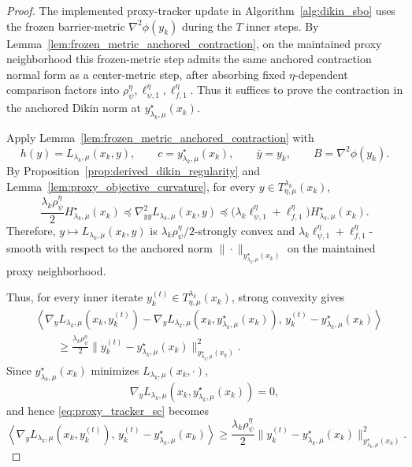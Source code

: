 \documentclass{article}
\begin{document}
\begin{proof}
The implemented proxy-tracker update in Algorithm~\ref{alg:dikin_sbo} uses the frozen barrier-metric
\(\nabla^2\phi(y_k)\) during the \(T\) inner steps. By
Lemma~\ref{lem:frozen_metric_anchored_contraction}, on the maintained proxy neighborhood this frozen-metric
step admits the same anchored contraction normal form as a center-metric step, after absorbing fixed
\(\eta\)-dependent comparison factors into
\(\rho_\psi^\eta,\ell_{\psi,1}^\eta,\ell_{f,1}^\eta\). Thus it suffices to prove the contraction in the
anchored Dikin norm at \(y_{\lambda_k,\mu}^\star(x_k)\).

Apply Lemma~\ref{lem:frozen_metric_anchored_contraction} with
\[
h(y)=L_{\lambda_k,\mu}(x_k,y),
\qquad
c=y_{\lambda_k,\mu}^\star(x_k),
\qquad
\bar y=y_k,
\qquad
B=\nabla^2\phi(y_k).
\]
By Proposition~\ref{prop:derived_dikin_regularity} and
Lemma~\ref{lem:proxy_objective_curvature}, for every
\(y\in T_{\eta,\mu}^{\lambda_k}(x_k)\),
\begin{equation}
\label{eq:proxy_tracker_curvature}
\frac{\lambda_k\rho_\psi^\eta}{2}H_{\lambda_k,\mu}^\star(x_k)
\preceq
\nabla_{yy}^2L_{\lambda_k,\mu}(x_k,y)
\preceq
\bigl(\lambda_k\ell_{\psi,1}^\eta+\ell_{f,1}^\eta\bigr)
H_{\lambda_k,\mu}^\star(x_k).
\end{equation}
Therefore, \(y\mapsto L_{\lambda_k,\mu}(x_k,y)\) is
\(\lambda_k\rho_\psi^\eta/2\)-strongly convex and
\(\lambda_k\ell_{\psi,1}^\eta+\ell_{f,1}^\eta\)-smooth with respect to the anchored norm
\(\|\cdot\|_{y_{\lambda_k,\mu}^\star(x_k)}\) on the maintained proxy neighborhood.

Thus, for every inner iterate
\(y_k^{(t)}\in T_{\eta,\mu}^{\lambda_k}(x_k)\), strong convexity gives
\begin{align}
&\left\langle
\nabla_yL_{\lambda_k,\mu}(x_k,y_k^{(t)})
-
\nabla_yL_{\lambda_k,\mu}(x_k,y_{\lambda_k,\mu}^\star(x_k)),
\,y_k^{(t)}-y_{\lambda_k,\mu}^\star(x_k)
\right\rangle
\nonumber\\
&\qquad\ge
\frac{\lambda_k\rho_\psi^\eta}{2}
\|y_k^{(t)}-y_{\lambda_k,\mu}^\star(x_k)\|_{y_{\lambda_k,\mu}^\star(x_k)}^2 .
\label{eq:proxy_tracker_sc}
\end{align}
Since \(y_{\lambda_k,\mu}^\star(x_k)\) minimizes \(L_{\lambda_k,\mu}(x_k,\cdot)\),
\[
\nabla_yL_{\lambda_k,\mu}(x_k,y_{\lambda_k,\mu}^\star(x_k))=0,
\]
and hence \eqref{eq:proxy_tracker_sc} becomes
\begin{equation}
\label{eq:proxy_tracker_sc_simplified}
\left\langle
\nabla_yL_{\lambda_k,\mu}(x_k,y_k^{(t)}),
\,y_k^{(t)}-y_{\lambda_k,\mu}^\star(x_k)
\right\rangle
\ge
\frac{\lambda_k\rho_\psi^\eta}{2}
\|y_k^{(t)}-y_{\lambda_k,\mu}^\star(x_k)\|_{y_{\lambda_k,\mu}^\star(x_k)}^2 .
\end{equation}


\end{proof}
\end{document}
